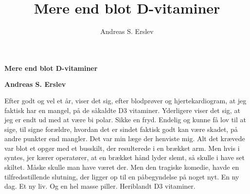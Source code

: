 \documentclass[]{article}
\title{Mere end blot D-vitaminer}
\author{Andreas S. Erslev}
\begin{document}
	
	\begin{center}
		\Large\textbf{Mere end blot D-vitaminer}
	\end{center}
	
	\begin{center}
		\large\textbf{Andreas S. Erslev}
	\end{center}
	
	Efter godt og vel et år, viser det sig, efter blodprøver og hjertekardiogram, at jeg faktisk har en mangel, på de såkaldte D3 vitaminer.
	\newline
	\newline
	Yderligere viser det sig, at jeg er endt ud med at være bi polar. Sikke en fryd. Endelig og kunne få lov til at sige, til signe forældre, hvordan det er sindet faktisk godt kan være skadet, på andre punkter end mangler.
	\newline
	\newline
	Det var min læge der henviste mig. Alt det krævede var blot et opgør med et busskilt, der resulterede i en brækket arm.
	\newline
	\newline
	Men hvis i syntes, jer kærer operatører, at en brækket hånd lyder slemt, så skulle i have set skiltet.
	\newline
	\newline
	Måske skulle man have været der. Men den tragiske komedie, havde en tilfredsstillende slutning, der ligger op til en påbegyndelse på noget nyt.
	\newline
	\newline
	En ny dag. Et ny liv. Og en hel masse piller. Heriblandt D3 vitaminer.
	
\end{document}
